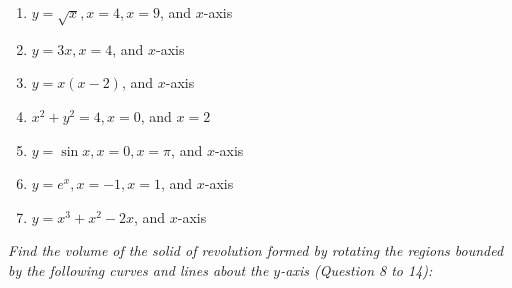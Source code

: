 \documentclass{report}
\begin{document}
\begin{enumerate}
    \item $y=\sqrt{x}, x=4, x=9$, and $x$-axis
    \item $y=3 x, x=4$, and $x$-axis
    \item $y=x(x-2)$, and $x$-axis
    \item $x^2+y^2=4, x=0$, and $x=2$
    \item $y=\sin x, x=0, x=\pi$, and $x$-axis
    \item $y=e^x, x=-1, x=1$, and $x$-axis
    \item $y=x^3+x^2-2 x$, and $x$-axis
\end{enumerate}

\noindent \hspace{1.2em}\textit{Find the volume of the solid of revolution formed by rotating the regions bounded by the following curves and lines about the $y$-axis (Question 8 to 14):}
\end{document}
